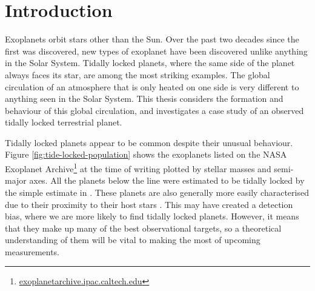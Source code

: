 
\chapter{Introduction}\label{sec:intro}


Exoplanets orbit stars other than the Sun. Over the past two decades since the first was discovered, new types of exoplanet have been discovered unlike anything in the Solar System. Tidally locked planets, where the same side of the planet always faces its star, are among the most striking examples. The global circulation of an atmosphere that is only heated on one side is very different to anything seen in the Solar System. This thesis considers the formation and behaviour of this global circulation, and investigates a case study of an observed tidally locked terrestrial planet.

Tidally locked planets appear to be common despite their unusual behaviour. Figure \ref{fig:tide-locked-population} shows the exoplanets listed on the NASA Exoplanet Archive\footnote{\url{exoplanetarchive.ipac.caltech.edu}} at the time of writing plotted by stellar masses and semi-major axes. All the planets below the line were estimated to be tidally locked by the simple estimate in \citet{pierrehumbert2018review}. These planets are also generally more easily characterised due to their proximity to their host stars \citep{crossfield2015observations}. This may have created a detection bias, where we are more likely to find tidally locked planets. However, it means that they make up many of the best observational targets, so a theoretical understanding of them will be vital to making the most of upcoming measurements.

